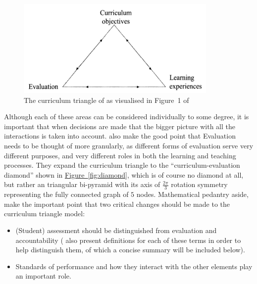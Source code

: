 \documentclass[twoside,12pt,a4paper]{report}
\newcommand{\reffig}[1]{\hyperref[fig:#1]{Figure~\ref{fig:#1}}}
\begin{document}
\begin{figure}[ht]
\centering
\includegraphics{./figures/curriculum-triangle.PNG}
\caption{The curriculum triangle of \protect{} as visualised in Figure~1 of \protect{}\label{fig:triangle}}
\end{figure}

Although each of these areas can be considered individually to some degree, it is important that when decisions are made that the bigger picture with all the interactions is taken into account.  also make the good point that Evaluation needs to be thought of more granularly, as different forms of evaluation serve very different purposes, and very different roles in both the learning and teaching processes. They expand the curriculum triangle to the ``curriculum-evaluation diamond'' shown in \reffig{diamond}, which is of course no diamond at all, but rather an triangular bi-pyramid with its axis of $\frac{2\pi}{3}$ rotation symmetry representing the fully connected graph of $5$ nodes. Mathematical pedantry aside,  make the important point that two critical changes should be made to the curriculum triangle model:
\begin{itemize}
	\item (Student) assessment should be distinguished from evaluation and accountability ( also present definitions for each of these terms in order to help distinguish them, of which a concise summary will be included below).
	\item Standards of performance and how they interact with the other elements play an important role.
\end{itemize}
\end{document}

